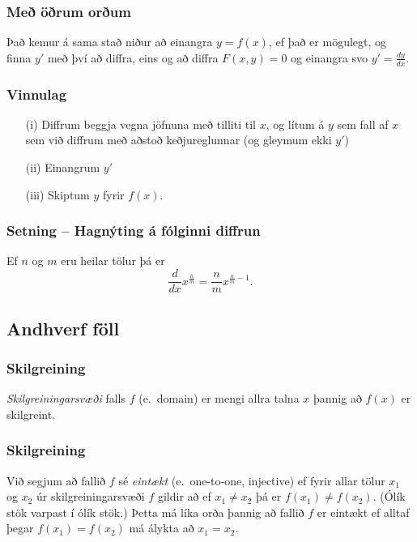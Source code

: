 \documentclass[icelandic,a4paper,12pt]{article}
\begin{document}
\subsubsection{Með öðrum orðum}
Það kemur á sama stað niður að einangra $y=f(x)$, ef það er mögulegt, 
og finna $y'$ með því að diffra, eins og að diffra $F(x,y)=0$ og einangra svo 
$y'=\frac{dy}{dx}$.

\subsubsection{Vinnulag}
\begin{itemize}
\item[(i)] Diffrum beggja vegna jöfnuna með tilliti til $x$, og lítum á $y$
sem fall af $x$ sem við diffrum með aðstoð keðjureglunnar 
(og gleymum ekki $y'$)
\item[(ii)] Einangrum $y'$
\item[(iii)] Skiptum $y$ fyrir $f(x)$.
\end{itemize}

\subsubsection{Setning -- Hagnýting á fólginni diffrun}
Ef $n$ og $m$ eru heilar tölur þá er
\begin{equation*}
 \frac{d}{dx} x^{\frac nm} = \frac nm x^{\frac nm -1}.
\end{equation*}

\subsection{Andhverf föll}
\subsubsection{Skilgreining}  \emph{Skilgreiningarsvæði} falls $f$ (e.~domain) er mengi allra 
talna $x$ þannig að $f(x)$ er skilgreint.

\subsubsection{Skilgreining} 
Við segjum að fallið $f$ sé \emph{eintækt} (e.~one-to-one, injective)
ef fyrir allar tölur $x_1$ og $x_2$ úr skilgreiningarsvæði $f$ gildir
að ef $x_1\neq x_2$ þá er $f(x_1)\neq f(x_2)$. \pause
(Ólík stök varpast í ólík stök.)  \pause
Þetta má líka orða þannig að fallið $f$ er eintækt ef
alltaf þegar $f(x_1)=f(x_2)$ má álykta að $x_1=x_2$.
\end{document}
